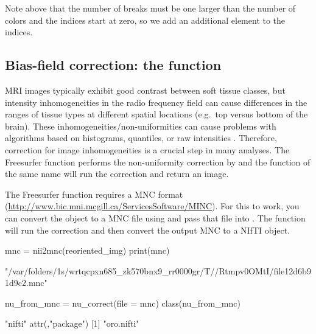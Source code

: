 Note above that the number of breaks must be one larger than the number
of colors and the indices start at zero, so we add an additional element
to the indices.

\subsection{\texorpdfstring{Bias-field correction: the
function}{Bias-field correction: the  function}}\label{bias-field-correction-the-function}

MRI images typically exhibit good contrast between soft tissue classes,
but intensity inhomogeneities in the radio frequency field can cause
differences in the ranges of tissue types at different spatial locations
(e.g.~top versus bottom of the brain). These
inhomogeneities/non-uniformities can cause problems with algorithms
based on histograms, quantiles, or raw intensities
\citep{zhang_segmentation_2001}. Therefore, correction for image
inhomogeneities is a crucial step in many analyses. The Freesurfer
function  performs the non-uniformity correction by
\citet{sled_nonparametric_1998} and the  function of the
same name will run the correction and return an image.

The Freesurfer  function requires a MNC format
(\url{http://www.bic.mni.mcgill.ca/ServicesSoftware/MINC}). For this to
work, you can convert the  object to a MNC file using
 and pass that file into . The
  function will run the correction and
then convert the output MNC to a NIfTI object.

\begin{Schunk}
\begin{Sinput}
mnc = nii2mnc(reoriented_img)
print(mnc)
\end{Sinput}
\begin{Soutput}
[1] "/var/folders/1s/wrtqcpxn685_zk570bnx9_rr0000gr/T//Rtmpv0OMtI/file12d6b91d9c2.mnc"
\end{Soutput}
\begin{Sinput}
nu_from_mnc = nu_correct(file = mnc)
class(nu_from_mnc)
\end{Sinput}
\begin{Soutput}
[1] "nifti"
attr(,"package")
[1] "oro.nifti"
\end{Soutput}
\end{Schunk}

